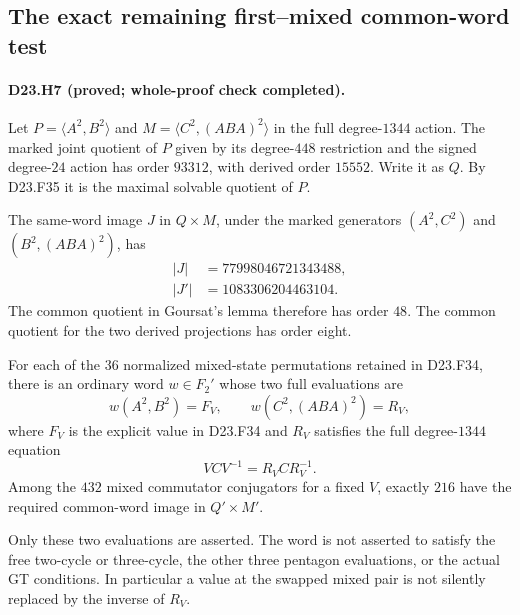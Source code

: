 \subsection{The exact remaining first--mixed common-word test}

\paragraph{D23.H7 (proved; whole-proof check completed).}
Let $P=\langle A^2,B^2\rangle$ and
$M=\langle C^2,(ABA)^2\rangle$ in the full degree-$1344$
action. The marked joint quotient of $P$ given by its
degree-$448$ restriction and the signed degree-$24$
action has order $93312$, with derived order $15552$.
Write it as $Q$. By D23.F35 it is the maximal solvable
quotient of $P$.

The same-word image $J$ in $Q\times M$, under the marked
generators $(A^2,C^2)$ and $(B^2,(ABA)^2)$, has
\[
 \begin{split}
 |J|&=77998046721343488,\\
 |J'|&=1083306204463104.
 \end{split}
\]
The common quotient in Goursat's lemma therefore has order
$48$. The common quotient for the two derived projections
has order eight.

For each of the $36$ normalized mixed-state permutations
retained in D23.F34, there is an ordinary word
$w\in F_2'$ whose two full evaluations are
\[
         w(A^2,B^2)=F_V,\qquad
         w(C^2,(ABA)^2)=R_V,
\]
where $F_V$ is the explicit value in D23.F34 and
$R_V$ satisfies the full degree-$1344$ equation
\[
                    VC V^{-1}=R_V C R_V^{-1}.
\]
Among the $432$ mixed commutator conjugators for a fixed
$V$, exactly $216$ have the required common-word image
in $Q'\times M'$.

Only these two evaluations are asserted. The word is not
asserted to satisfy the free two-cycle or three-cycle,
the other three pentagon evaluations, or the actual GT
conditions. In particular a value at the swapped mixed
pair is not silently replaced by the inverse of $R_V$.

